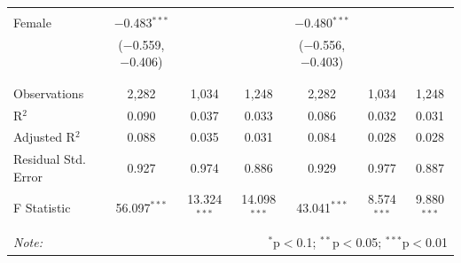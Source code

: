 \documentclass[12pt,a4paper]{article}
\numberwithin{equation}{section}
\begin{document}
\begin{landscape}
\begin{table}[!htbp]
\begin{tabular}{@{\extracolsep{5pt}}lcccccc}
			& & & & & & \\ 
			Female & $-$0.483$^{***}$ &  &  & $-$0.480$^{***}$ &  &  \\ 
			& ($-$0.559, $-$0.406) &  &  & ($-$0.556, $-$0.403) &  &  \\ 
			& & & & & & \\ 
			\hline \\[-1.8ex] 
			Observations & 2,282 & 1,034 & 1,248 & 2,282 & 1,034 & 1,248 \\ 
			R$^{2}$ & 0.090 & 0.037 & 0.033 & 0.086 & 0.032 & 0.031 \\ 
			Adjusted R$^{2}$ & 0.088 & 0.035 & 0.031 & 0.084 & 0.028 & 0.028 \\ 
			Residual Std. Error & 0.927 & 0.974 & 0.886 & 0.929 & 0.977 & 0.887 \\ 
			F Statistic & 56.097$^{***}$ & 13.324$^{***}$ & 14.098$^{***}$ & 43.041$^{***}$ & 8.574$^{***}$ & 9.880$^{***}$ \\ 
			\hline 
			\hline \\[-1.8ex] 
			\textit{Note:}  & \multicolumn{6}{r}{$^{*}$p$<$0.1; $^{**}$p$<$0.05; $^{***}$p$<$0.01} \\ 
		\end{tabular} 
	\end{table} 
	
\end{landscape}

\newpage
\end{document}
